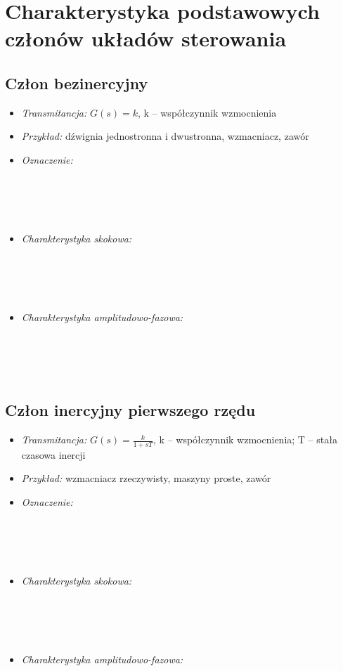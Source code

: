 \documentclass[a4paper]{article}
\begin{document}
\section{Charakterystyka podstawowych członów układów sterowania}
\subsection{Człon bezinercyjny}
\begin{itemize}
\item \emph{Transmitancja: } $G(s) = k$, k -- współczynnik wzmocnienia
\item \emph{Przykład: } dźwignia jednostronna i dwustronna, wzmacniacz, zawór
\item \emph {Oznaczenie: } \\\\\\\\\\
\item \emph{Charakterystyka skokowa: } \\\\\\\\\\
\item \emph{Charakterystyka amplitudowo-fazowa: } \\\\\\\\\\
\end{itemize}
\subsection{Człon inercyjny pierwszego rzędu}
\begin{itemize}
\item \emph{Transmitancja: } $G(s) = \frac{k}{1+sT}$, k -- współczynnik wzmocnienia; T -- stała czasowa inercji
\item \emph{Przykład: } wzmacniacz rzeczywisty, maszyny proste, zawór
\item \emph {Oznaczenie: } \\\\\\\\\\
\item \emph{Charakterystyka skokowa: } \\\\\\\\\\
\item \emph{Charakterystyka amplitudowo-fazowa: } \\\\\\\\\\
\end{itemize} \pagebreak
\end{document}
